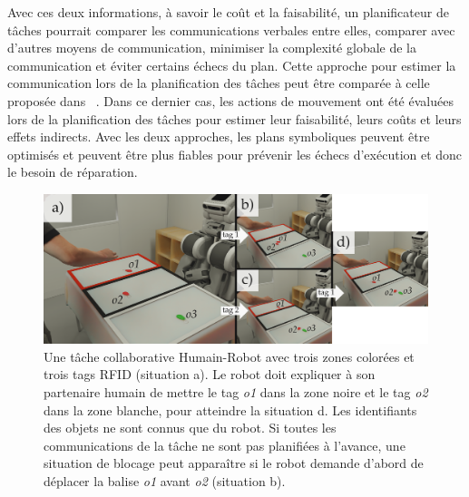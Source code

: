 Avec ces deux informations, à savoir le coût et la faisabilité, un planificateur de tâches pourrait comparer les communications verbales entre elles, comparer avec d'autres moyens de communication, minimiser la complexité globale de la communication et éviter certains échecs du plan. Cette approche pour estimer la communication lors de la planification des tâches peut être comparée à celle proposée dans ~\cite{lallement_2016_symbolic}. Dans ce dernier cas, les actions de mouvement ont été évaluées lors de la planification des tâches pour estimer leur faisabilité, leurs coûts et leurs effets indirects. Avec les deux approches, les plans symboliques peuvent être optimisés et peuvent être plus fiables pour prévenir les échecs d'exécution et donc le besoin de réparation. 

\begin{figure}[t!]
\centering
\includegraphics[width=\textwidth]{figures/chapter5/intro/intro.png}
\caption{\label{fig:annex_chap5_intro} Une tâche collaborative Humain-Robot avec trois zones colorées et trois tags RFID (situation a). Le robot doit expliquer à son partenaire humain de mettre le tag \textit{o1} dans la zone noire et le tag \textit{o2} dans la zone blanche, pour atteindre la situation d. Les identifiants des objets ne sont connus que du robot.
Si toutes les communications de la tâche ne sont pas planifiées à l'avance, une situation de blocage peut apparaître si le robot demande d'abord de déplacer la balise \textit{o1} avant \textit{o2} (situation b).}
\end{figure}

